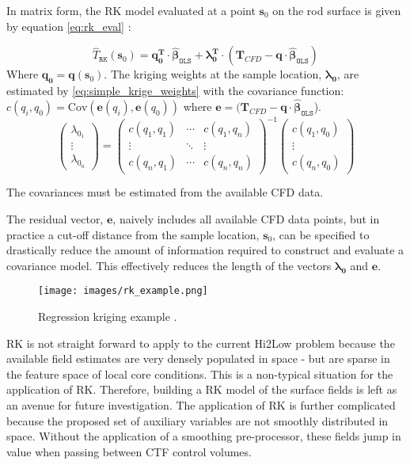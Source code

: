 In matrix form, the RK model evaluated at a point $\mathbf{s}_0 $ on the rod surface is given by equation \ref{eq:rk_eval} \cite{Hengl07}:

\begin{equation}
\hat T_\mathtt{RK}(\mathbf{s}_0 ) = \mathbf{q}_\mathbf{0}^\mathbf{T} \cdot \mathbf{\hat \beta}_\mathtt{OLS} + \mathbf{\lambda }_\mathbf{0}^\mathbf{T} \cdot (\mathbf T_{CFD}
- \mathbf{q} \cdot \mathbf{\hat \beta }_\mathtt{OLS} )
\label{eq:rk_eval}
\end{equation}
Where $\mathbf{q}_\mathbf{0}= \mathbf{q}(\mathbf s_0)$. The kriging weights at the sample location, $\mathbf{\lambda_0}$, are estimated by \ref{eq:simple_krige_weights} with the covariance function: $c(q_i, q_0)= \mathrm{Cov}(\mathbf e(q_i), \mathbf e(q_0))$ where $\mathbf e = (\mathbf T_{CFD} - \mathbf{q} \cdot \mathbf{\hat \beta }_\mathtt{OLS}$). 
\begin{equation}
\begin{pmatrix}\lambda_{0_1} \\ \vdots \\ \lambda_{0_n} \end{pmatrix}=
\begin{pmatrix}c(q_1,q_1) & \cdots & c(q_1,q_n) \\
\vdots & \ddots & \vdots  \\
c(q_n,q_1) & \cdots & c(q_n,q_n) 
\end{pmatrix}^{-1}
\begin{pmatrix}c(q_1,q_0) \\ \vdots \\ c(q_n,q_0) \end{pmatrix}
\label{eq:simple_krige_weights}
\end{equation}

The covariances must be estimated from the available CFD data.  

The residual vector, $\mathbf e$, naively includes all available CFD data points, but in practice a cut-off distance from the sample location, $\mathbf s_0$, can be specified to drastically reduce the amount of information required to construct and evaluate a covariance model.  This effectively reduces the length of the vectors $\mathbf{\lambda_0}$ and $\mathbf e$.

\begin{figure}[hbtp]
\centering
\texttt{[image: images/rk\_example.png]}
\caption{Regression kriging example \cite{Hengl07}.}
\label{fit:rk}
\end{figure}

RK is not straight forward to apply to the current Hi2Low problem because the available field estimates are very densely populated in space - but are sparse in the feature space of local core conditions. This is a non-typical situation for the application of RK. Therefore, building a RK model of the surface fields is left as an avenue for future investigation.
The application of RK is further complicated because the proposed set of auxiliary variables are not smoothly distributed in space.  Without the application of a smoothing pre-processor, these
fields jump in value when passing between CTF control volumes.

